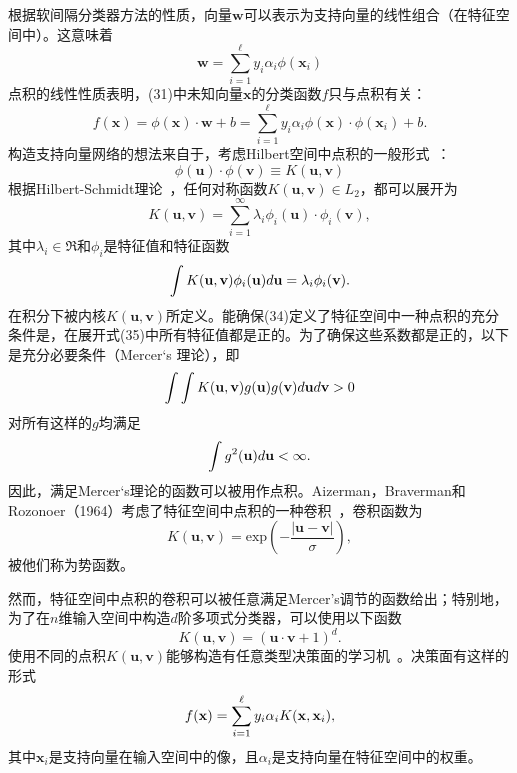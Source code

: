 \documentclass[lang=cn,11pt,a4paper]{elegantpaper}
\newcommand{\upcite}[1]{\textsuperscript{\textsuperscript{\cite{#1}}}}
\begin{document}
	根据软间隔分类器方法的性质，向量$\mathbf{w}$可以表示为支持向量的线性组合（在特征空间中）。这意味着
	\begin{equation}
		\mathbf{w}=\sum_{i=1}^{\ell}y_i\alpha_i\phi(\mathbf{x}_i)\tag{32}
	\end{equation}
	点积的线性性质表明，(31)中未知向量$\mathbf{x}$的分类函数$f$只与点积有关：
	\begin{equation}
		f(\mathbf{x})=\phi(\mathbf{x})·\mathbf{w}+b=\sum_{i=1}^{\ell}y_i\alpha_i\phi(\mathbf{x})·\phi(\mathbf{x}_i)+b.\tag{33}
	\end{equation}
	构造支持向量网络的想法来自于，考虑Hilbert空间中点积的一般形式~\upcite{anderson1962classification}：
	\begin{equation}
		\phi(\mathbf{u})·\phi(\mathbf{v})\equiv K(\mathbf{u},\mathbf{v})\tag{34}
	\end{equation}
	根据Hilbert-Schmidt理论~\upcite{courant1953methods}，任何对称函数$K(\mathbf{u},\mathbf{v})\in L_2$，都可以展开为
	\begin{equation}
		K(\mathbf{u},\mathbf{v})=\sum_{i=1}^\infty\lambda_i\phi_i(\mathbf{u})·\phi_i(\mathbf{v}),\tag{35}
	\end{equation}
	其中$\lambda_i\in\mathfrak{R}$和$\phi_i$是特征值和特征函数
	\begin{equation}
		\int K(\mathbf{u},\mathbf{v}) \phi_i(\mathbf{u})d\mathbf{u} = \lambda_i \phi_i(\mathbf{v}). \notag
	\end{equation}
	在积分下被内核$K(\mathbf{u},\mathbf{v})$所定义。能确保(34)定义了特征空间中一种点积的充分条件是，在展开式(35)中所有特征值都是正的。为了确保这些系数都是正的，以下是充分必要条件（Mercer‘s 理论），即
	\begin{equation}
		\int \int K(\mathbf{u},\mathbf{v})g(\mathbf{u})g(\mathbf{v})d\mathbf{u}d\mathbf{v}>0 \notag
	\end{equation}
	对所有这样的$g$均满足
	\begin{equation}
		\int g^2(\mathbf{u})d\mathbf{u}<\infty.\notag
	\end{equation}
	因此，满足Mercer‘s理论的函数可以被用作点积。Aizerman，Braverman和Rozonoer（1964）考虑了特征空间中点积的一种卷积~\upcite{aizerman1964theoretical}，卷积函数为
	\begin{equation}
		K(\mathbf{u},\mathbf{v})=\mathrm{exp}\left(-\frac{|\mathbf{u}-\mathbf{v}|}{\sigma}\right),\tag{36}
	\end{equation}
	被他们称为势函数。

	然而，特征空间中点积的卷积可以被任意满足Mercer’s调节的函数给出；特别地，为了在$n$维输入空间中构造$d$阶多项式分类器，可以使用以下函数
	\begin{equation}
		K(\mathbf{u},\mathbf{v})=(\mathbf{u}·\mathbf{v}+1)^d.\tag{37}
	\end{equation}
	使用不同的点积$K(\mathbf{u},\mathbf{v})$能够构造有任意类型决策面的学习机~\upcite{boser1992training}。决策面有这样的形式
	\begin{equation}
		f(\mathbf{x})=\sum_{i=1}^{\ell}y_i\alpha_iK(\mathbf{x},\mathbf{x}_i),\notag
	\end{equation}
	其中$\mathbf{x}_i$是支持向量在输入空间中的像，且$\alpha_i$是支持向量在特征空间中的权重。
\end{document}
